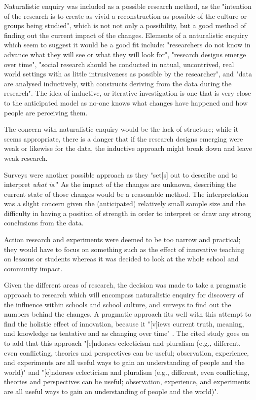 Naturalistic enquiry was included as a possible research method, as the "intention of the research is to create as vivid a reconstruction as possible of the culture or groups being studied", \cite{Cohen2005} which is not not only a possibility, but a good method of finding out the current impact of the changes. Elements of a naturalistic enquiry which seem to suggest it would be a good fit include: "researchers do not know in advance what they will see or what they will look for", "research designs emerge over time", "social research should be conducted in natual, uncontrived, real world settings with as little intrusiveness as possible by the researcher", and "data are analysed inductively, with constructs deriving from the data during the research". The idea of inductive, or iterative investigation is one that is very close to the anticipated model as no-one knows what changes have happened and how people are perceiving them. 

The concern with naturalistic enquiry would be the lack of structure; while it seems appropriate, there is a danger that if the research designs emerging were weak or likewise for the data, the inductive approach might break down and leave weak research.

Surveys were another possible approach as they "set[s] out to describe and to interpret \textit{what is}." \cite[p. 169]{Cohen2005} As the impact of the changes are unknown, describing the current state of those changes would be a reasonable method. The interpretation was a slight concern given the (anticipated) relatively small sample size and the difficulty in having a position of strength in order to interpret or draw any strong conclusions from the data.

Action research and experiments were deemed to be too narrow and practical; they would have to focus on something such as the effect of innovative teaching on lessons or students whereas it was decided to look at the whole school and community impact.

Given the different areas of research, the decision was made to take a pragmatic approach to research which will encompass naturalistic enquiry for discovery of the influence within schools and school culture, and surveys to find out the numbers behind the changes.  A pragmatic approach fits well with this attempt to find the holistic effect of innovation, because it "[v]iews current truth, meaning, and knowledge as tentative and as changing over time" \cite[p. 18]{Johnson_2004}. The cited study goes on to add that this approach "[e]ndorses eclecticism and pluralism (e.g., different, even conflicting, theories and perspectives can be useful; observation, experience, and experiments are all useful ways to gain an understanding of people and the world)"  and "[e]ndorses eclecticism and pluralism (e.g., different, even conflicting, theories and perspectives can be useful; observation, experience, and experiments are all useful ways to gain an understanding of people and the world)".

